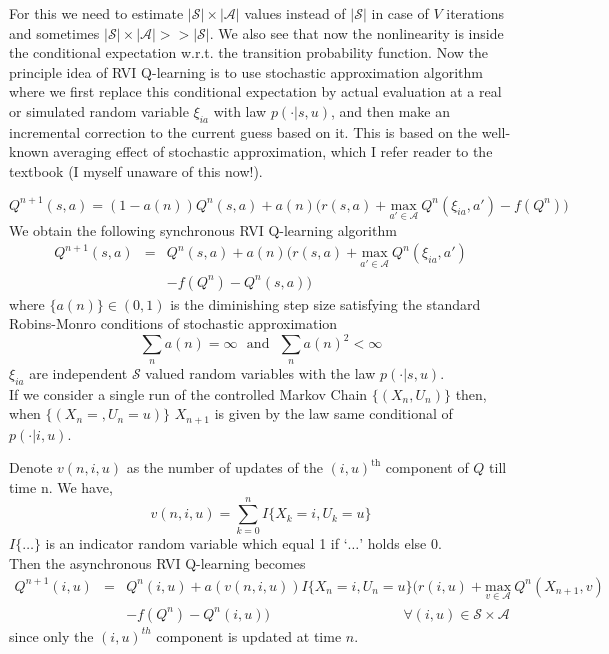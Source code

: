 \documentclass{article}
\theoremstyle{definition}
\begin{document}
For this we need to estimate $|\mathcal{S}|\times|\mathcal{A}|$ values instead of $|\mathcal{S}|$ in case of $V$ iterations and sometimes $|\mathcal{S}|\times|\mathcal{A}|>>|\mathcal{S}|$. We also see that now the nonlinearity is inside the conditional expectation w.r.t. the transition probability function.
\clearpage
Now the principle idea of RVI Q-learning is to use stochastic approximation algorithm where we first replace this conditional expectation by actual evaluation at a real or simulated random variable $\xi_{ia}$ with law $p(\cdot|s,u)$, and then make an incremental correction to the current guess based on it. This is based on the well-known averaging effect of stochastic approximation, which I refer reader to the textbook \cite{borkarbook} (I myself unaware of this now!).

\begin{equation}
    Q^{n+1}(s,a) = (1-a(n))Q^{n}(s,a) +a(n)\Big(r(s,a)+\underset{a'\in\mathcal{A}}{\text{max}}\ Q^n(\xi_{ia},a')-f(Q^n)\Big) \nonumber
\end{equation}
We obtain the following synchronous RVI Q-learning algorithm 
\begin{eqnarray}
    Q^{n+1}(s,a) &=& Q^{n}(s,a) +a(n)\Big(r(s,a)+\underset{a'\in\mathcal{A}}{\text{max}}\ Q^n(\xi_{ia},a')\nonumber\\ 
    && -f(Q^n)-Q^{n}(s,a)\Big)
\end{eqnarray}
where $\{a(n)\}\in(0,1)$ is the diminishing step size satisfying the standard Robins-Monro conditions of stochastic approximation 
\[\sum_n a(n)=\infty \ \ \ \text{and} \ \ \ \sum_n a(n)^2 <\infty\]
$\xi_{ia}$ are independent $\mathcal{S}$ valued random variables with the law $p(\cdot|s,u)$.\\

If we consider a single run of the controlled Markov Chain $\{(X_n,U_n)\}$ then, when $\{(X_n=,U_n=u)\}$ $X_{n+1}$ is given by the law same conditional of $p(\cdot|i,u)$. 

Denote $v(n,i,u)$ as the number of updates of the $(i,u)^{\text{th}}$ component of $Q$ till time n. We have,
\[v(n,i,u)=\sum_{k=0}^n I\{X_k=i,U_k=u\}\]
$I\{\dotsc\}$ is an indicator random variable which equal 1 if `$\dotsc$' holds else 0.\\

Then the asynchronous RVI Q-learning becomes
\begin{eqnarray}
    \label{eqn:rviq}
    Q^{n+1}(i,u) &=& Q^{n}(i,u) +a(v(n,i,u))I\{X_n=i,U_n=u\}\Big(r(i,u)+\underset{v\in\mathcal{A}}{\text{max}}\ Q^n(X_{n+1},v)\nonumber\\ 
    && -f(Q^n)-Q^{n}(i,u)\Big)  \hspace{4cm} \forall (i,u)\in \mathcal{S}\times\mathcal{A} 
\end{eqnarray}
since only the $(i,u)^{th}$ component is updated at time $n$.
\end{document}
